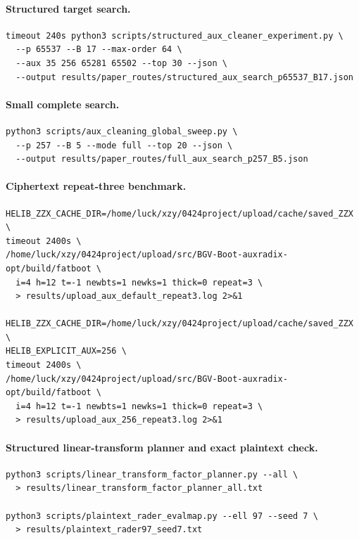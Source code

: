\documentclass[a4paper,runningheads]{llncs}
\begin{document}
\paragraph{Structured target search.}
\begin{verbatim}
timeout 240s python3 scripts/structured_aux_cleaner_experiment.py \
  --p 65537 --B 17 --max-order 64 \
  --aux 35 256 65281 65502 --top 30 --json \
  --output results/paper_routes/structured_aux_search_p65537_B17.json
\end{verbatim}

\paragraph{Small complete search.}
\begin{verbatim}
python3 scripts/aux_cleaning_global_sweep.py \
  --p 257 --B 5 --mode full --top 20 --json \
  --output results/paper_routes/full_aux_search_p257_B5.json
\end{verbatim}

\paragraph{Ciphertext repeat-three benchmark.}
\begin{verbatim}
HELIB_ZZX_CACHE_DIR=/home/luck/xzy/0424project/upload/cache/saved_ZZX \
timeout 2400s \
/home/luck/xzy/0424project/upload/src/BGV-Boot-auxradix-opt/build/fatboot \
  i=4 h=12 t=-1 newbts=1 newks=1 thick=0 repeat=3 \
  > results/upload_aux_default_repeat3.log 2>&1

HELIB_ZZX_CACHE_DIR=/home/luck/xzy/0424project/upload/cache/saved_ZZX \
HELIB_EXPLICIT_AUX=256 \
timeout 2400s \
/home/luck/xzy/0424project/upload/src/BGV-Boot-auxradix-opt/build/fatboot \
  i=4 h=12 t=-1 newbts=1 newks=1 thick=0 repeat=3 \
  > results/upload_aux_256_repeat3.log 2>&1
\end{verbatim}


\paragraph{Structured linear-transform planner and exact plaintext check.}
\begin{verbatim}
python3 scripts/linear_transform_factor_planner.py --all \
  > results/linear_transform_factor_planner_all.txt

python3 scripts/plaintext_rader_evalmap.py --ell 97 --seed 7 \
  > results/plaintext_rader97_seed7.txt
\end{verbatim}
\end{document}
